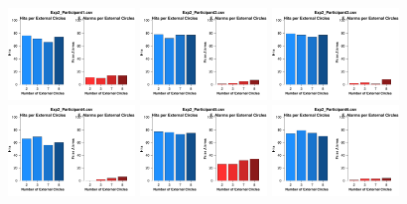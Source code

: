 \begin{figure}[th]
\centering
\includegraphics[width=0.30\textwidth]{Figures/Numero_Exp2_P1} \includegraphics[width=0.30\textwidth]{Figures/Numero_Exp2_P2} \includegraphics[width=0.30\textwidth]{Figures/Numero_Exp2_P3}
\includegraphics[width=0.30\textwidth]{Figures/Numero_Exp2_P4} \includegraphics[width=0.30\textwidth]{Figures/Numero_Exp2_P5} \includegraphics[width=0.30\textwidth]{Figures/Numero_Exp2_P6}

\end{figure}
